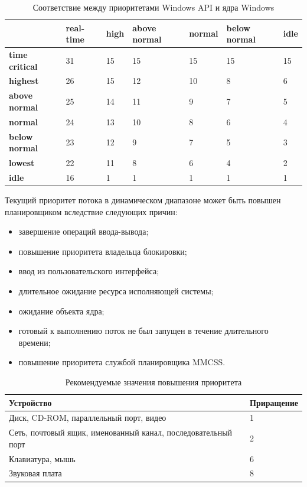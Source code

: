 \documentclass[14pt]{extarticle}
\begin{document}
\begin{table}[h]
    \caption{Соответствие между приоритетами Windows API и ядра Windows}
    \centering
    \begin{tabular}{|l|p{45pt}|p{45pt}|p{45pt}|p{45pt}|p{45pt}|p{45pt}|}
        \hline
        & \textbf{real-time} & \textbf{high} & \textbf{above normal} & \textbf{normal} & \textbf{below normal} & \textbf{idle} \\
        \hline
        \textbf{time critical} & 31 & 15 & 15 & 15 & 15 & 15 \\
        \hline
        \textbf{highest} & 26 & 15 & 12 & 10 & 8 & 6 \\
        \hline
        \textbf{above normal} & 25 & 14 & 11 & 9 & 7 & 5 \\
        \hline
        \textbf{normal} & 24 & 13 & 10 & 8 & 6 & 4 \\
        \hline
        \textbf{below normal} & 23 & 12 & 9 & 7 & 5 & 3 \\
        \hline
        \textbf{lowest} & 22 & 11 & 8 & 6 & 4 & 2 \\
        \hline
        \textbf{idle} & 16 & 1 & 1 & 1 & 1 & 1 \\
        \hline
    \end{tabular}
    \label{tbl:priority}
\end{table}

Текущий приоритет потока в динамическом диапазоне может быть повышен
планировщиком вследствие следующих причин:
\begin{itemize}
    \item завершение операций ввода-вывода;
    \item повышение приоритета владельца блокировки;
    \item ввод из пользовательского интерфейса;
    \item длительное ожидание ресурса исполняющей системы;
    \item ожидание объекта ядра;
    \item готовый к выполнению поток не был запущен в течение длительного
        времени;
    \item повышение приоритета службой планировщика MMCSS.
\end{itemize}

\begin{table}[h]
    \caption{Рекомендуемые значения повышения приоритета}
    \centering
    \begin{tabular}{|p{100mm}|l|}
        \hline
        \textbf{Устройство} & \textbf{Приращение} \\
        \hline
        Диск, CD-ROM, параллельный порт, видео & 1 \\
        \hline
        Сеть, почтовый ящик, именованный канал, последовательный порт & 2 \\
        \hline
        Клавиатура, мышь & 6 \\
        \hline
        Звуковая плата & 8 \\
        \hline
    \end{tabular}
    \label{tab:io}
\end{table}
\end{document}

